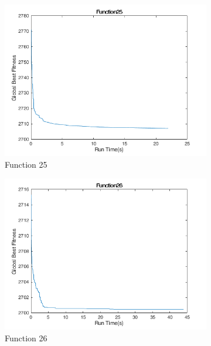 \begin{figure}
  \centering
  \begin{subfigure}[b]{0.4\textwidth}
    \includegraphics[width=\textwidth]{img/cecrt/f25}
    \caption{Function 25}
  \end{subfigure}
  \begin{subfigure}[b]{0.4\textwidth}
    \includegraphics[width=\textwidth]{img/cecrt/f26}
    \caption{Function 26}
  \end{subfigure}
  \begin{subfigure}[b]{0.4\textwidth}

\end{subfigure}
\end{figure}
